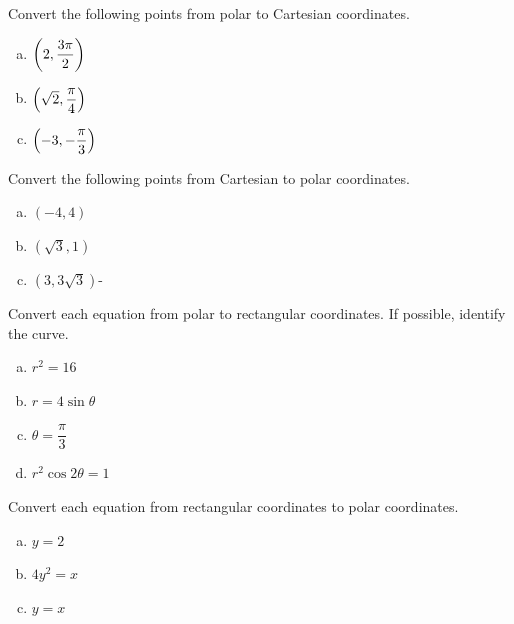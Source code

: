 \documentclass[notes]{subfiles}
\begin{document}
		\begin{ex}
			Convert the following points from polar to Cartesian coordinates.
			\begin{enumerate}[(a)]
				\item $\left( 2,\dfrac{3\pi}{2}\right)$
				\item $\left( \sqrt{2},\dfrac{\pi}{4}\right)$
				\item $\left( -3,-\dfrac{\pi}{3}\right)$
			\end{enumerate}
		\end{ex}
		\begin{ex}
			Convert the following points from Cartesian to polar coordinates.
			\begin{enumerate}[(a)]
				\item $(-4,4)$
					\vs{1}
				\item $(\sqrt{3},1)$
					\vs{1}
				\item $(3,3\sqrt{3})$-
					\vs{1}
			\end{enumerate}
		\end{ex}
			\newpage
			
		\begin{ex}
			Convert each equation from polar to rectangular coordinates.  If possible, identify the curve.
			\begin{enumerate}[(a)]
				\item $r^2 = 16$
					
				\item $r = 4\sin\theta$
					
				\item $\theta =\dfrac{\pi}{3}$
					
				\item $r^2\cos2\theta = 1$
					\vs{1}
			\end{enumerate}
		\end{ex}
		
		\begin{ex}
			Convert each equation from rectangular coordinates to polar coordinates.
			\begin{enumerate}[(a)]
				\item $y = 2$
					\vs{1}
					
				\item $4y^2 = x$
					\vs{1}
					 
				\item $y = x$
					\vs{1} 
			\end{enumerate}
		\end{ex}
			\newpage
			
\end{document}
